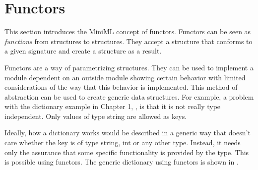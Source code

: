 \documentclass[10pt,a4paper,master=cws, masteroption=ai,english,inputenc=utf8]{kulemt}
\begin{document}
\section{Functors\label{sec:Functors}}
This section introduces the MiniML concept of functors. Functors can be seen as \emph{functions} from structures to structures.
They accept a structure that conforms to a given signature and create a structure as a result.

Functors are a way of parametrizing structures.
They can be used to implement a module dependent on an outside module showing certain behavior with limited considerations of the way that this behavior is implemented.
This method of abstraction can be used to create generic data structures.
For example, a problem with the dictionary example in Chapter 1, , is that it is not really type independent. 
Only values of type string are allowed as keys.

Ideally, how a dictionary works would be described in a generic way that doesn't care whether the key is of type string, int or any other type.
Instead, it needs only the assurance that some specific functionality is provided by the type.
This is possible using functors.
The generic dictionary using functors is shown in .
\end{document}
